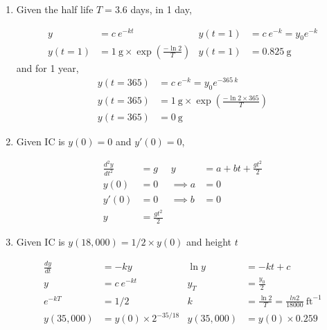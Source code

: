 \begin{enumerate}
    \item Given the half life $ T = 3.6 $ days, in 1 day,

          \begin{align}
              y        & = c\ e^{-kt}                                               &
              y(t = 1) & = c\ e^{-k} = y_{0} e ^{-k}                                  \\
              y(t = 1) & = 1\ \mathrm{g} \times \exp \left(\frac{- \ln 2}{T}\right) &
              y(t = 1) & = 0.825\ \mathrm{g}
          \end{align}
          and for 1 year,
          \begin{align}
              y(t = 365) & = c\ e^{-k} = y_{0} e ^{-365\ k}                            \\
              y(t = 365) & = 1\ \mathrm{g} \times \exp \left(\frac{- \ln 2 \times 365}
              {T}\right)                                                               \\
              y(t = 365) & = 0\ \mathrm{g}
          \end{align}


    \item Given IC is $y(0) = 0$ and $y'(0) = 0$,

          \begin{align}
              \frac{d^{2}y}{dt^{2}} & = g                         &
              y                     & = a + bt + \frac{gt^{2}}{2}   \\
              y(0)                  & = 0                         &
              \implies a            & = 0                           \\
              y'(0)                 & = 0                         &
              \implies b            & = 0                           \\
              y                     & = \frac{gt^{2}}{2}
          \end{align}


    \item Given IC is $y(18,000) = 1/2 \times y(0)$ and height $t$

          \begin{align}
              \frac{dy}{dt} & = -ky                                  &
              \ln y         & = -kt + c                                \\
              y             & = c \ e^{-kt}                          &
              y_{T}         & = \frac{y_{0}}{2}                        \\
              e^{-kT}       & = 1/2                                  &
              k             & = \frac{\ln 2}{T} = \frac{ln 2}{18000}
              \  \mathrm{ft}^{-1}                                      \\
              y(35,000)     & = y(0) \times 2^{-35/18}               &
              y(35,000)     & = y(0) \times 0.259
          \end{align}

\end{enumerate}


